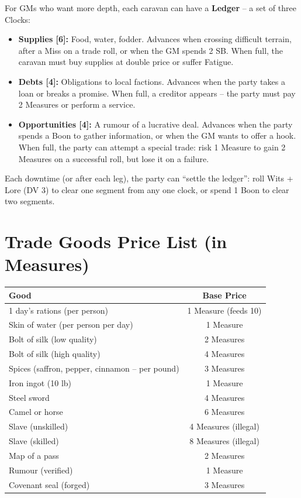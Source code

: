 \documentclass[11pt]{book}
\begin{document}
For GMs who want more depth, each caravan can have a \textbf{Ledger} – a set of three Clocks:
\begin{itemize}
    \item \textbf{Supplies [6]:} Food, water, fodder. Advances when crossing difficult terrain, after a Miss on a trade roll, or when the GM spends 2 SB. When full, the caravan must buy supplies at double price or suffer Fatigue.
    \item \textbf{Debts [4]:} Obligations to local factions. Advances when the party takes a loan or breaks a promise. When full, a creditor appears – the party must pay 2 Measures or perform a service.
    \item \textbf{Opportunities [4]:} A rumour of a lucrative deal. Advances when the party spends a Boon to gather information, or when the GM wants to offer a hook. When full, the party can attempt a special trade: risk 1 Measure to gain 2 Measures on a successful roll, but lose it on a failure.
\end{itemize}

Each downtime (or after each leg), the party can “settle the ledger”: roll Wits + Lore (DV 3) to clear one segment from any one clock, or spend 1 Boon to clear two segments.

\section{Trade Goods Price List (in Measures)}
\begin{center}
\begin{tabular}{|l|c|}
\hline
\textbf{Good} & \textbf{Base Price} \\
\hline
1 day’s rations (per person) & 1 Measure (feeds 10) \\
\hline
Skin of water (per person per day) & 1 Measure \\
\hline
Bolt of silk (low quality) & 2 Measures \\
\hline
Bolt of silk (high quality) & 4 Measures \\
\hline
Spices (saffron, pepper, cinnamon – per pound) & 3 Measures \\
\hline
Iron ingot (10 lb) & 1 Measure \\
\hline
Steel sword & 4 Measures \\
\hline
Camel or horse & 6 Measures \\
\hline
Slave (unskilled) & 4 Measures (illegal) \\
\hline
Slave (skilled) & 8 Measures (illegal) \\
\hline
Map of a pass & 2 Measures \\
\hline
Rumour (verified) & 1 Measure \\
\hline
Covenant seal (forged) & 3 Measures \\
\hline
\end{tabular}
\end{center}
\end{document}
